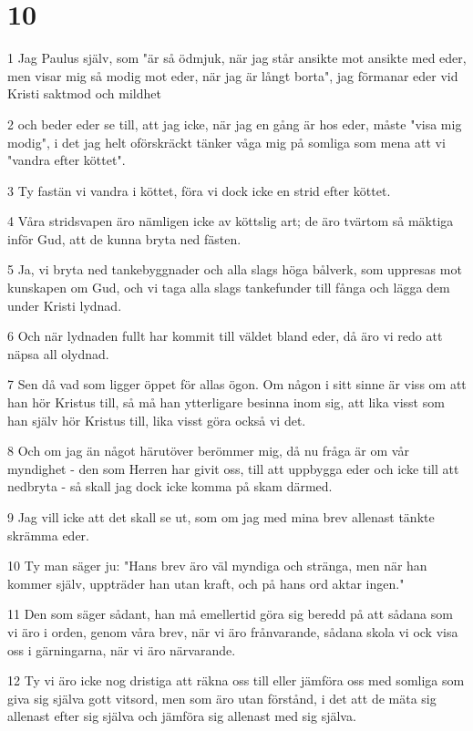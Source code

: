 \chapter{10}

\par 1 Jag Paulus själv, som "är så ödmjuk, när jag står ansikte mot ansikte med eder, men visar mig så modig mot eder, när jag är långt borta", jag förmanar eder vid Kristi saktmod och mildhet
\par 2 och beder eder se till, att jag icke, när jag en gång är hos eder, måste "visa mig modig", i det jag helt oförskräckt tänker våga mig på somliga som mena att vi "vandra efter köttet".
\par 3 Ty fastän vi vandra i köttet, föra vi dock icke en strid efter köttet.
\par 4 Våra stridsvapen äro nämligen icke av köttslig art; de äro tvärtom så mäktiga inför Gud, att de kunna bryta ned fästen.
\par 5 Ja, vi bryta ned tankebyggnader och alla slags höga bålverk, som uppresas mot kunskapen om Gud, och vi taga alla slags tankefunder till fånga och lägga dem under Kristi lydnad.
\par 6 Och när lydnaden fullt har kommit till väldet bland eder, då äro vi redo att näpsa all olydnad.
\par 7 Sen då vad som ligger öppet för allas ögon. Om någon i sitt sinne är viss om att han hör Kristus till, så må han ytterligare besinna inom sig, att lika visst som han själv hör Kristus till, lika visst göra också vi det.
\par 8 Och om jag än något härutöver berömmer mig, då nu fråga är om vår myndighet - den som Herren har givit oss, till att uppbygga eder och icke till att nedbryta - så skall jag dock icke komma på skam därmed.
\par 9 Jag vill icke att det skall se ut, som om jag med mina brev allenast tänkte skrämma eder.
\par 10 Ty man säger ju: "Hans brev äro väl myndiga och stränga, men när han kommer själv, uppträder han utan kraft, och på hans ord aktar ingen."
\par 11 Den som säger sådant, han må emellertid göra sig beredd på att sådana som vi äro i orden, genom våra brev, när vi äro frånvarande, sådana skola vi ock visa oss i gärningarna, när vi äro närvarande.
\par 12 Ty vi äro icke nog dristiga att räkna oss till eller jämföra oss med somliga som giva sig själva gott vitsord, men som äro utan förstånd, i det att de mäta sig allenast efter sig själva och jämföra sig allenast med sig själva.
